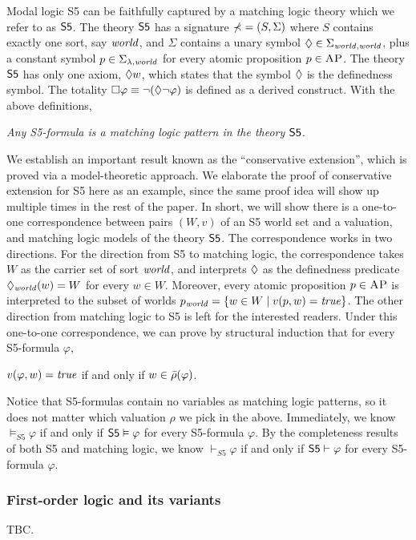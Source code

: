 \documentclass{amsart}
\begin{document}
Modal logic S5 can be faithfully captured by
a matching logic theory which we refer to as $\mathsf{S5}$.
The theory $\mathsf{S5}$ has a signature $\mathbb{\Sigma} = (S, \Sigma)$ where
$S$ contains exactly one sort, say $\mathit{world}$,
and $\Sigma$ contains a unary symbol
${\lozenge} \in \Sigma_{\mathit{world},\mathit{world}}$,
plus a constant symbol $p \in \Sigma_{\lambda,\mathit{world}}$
for every atomic proposition $p \in \textsc{AP}$.
The theory $\mathsf{S5}$ has only one axiom, ${\lozenge} w$, which states that
the symbol ${\lozenge}$ is the definedness symbol.
The totality ${\square} \varphi \equiv \neg ({\lozenge} \neg \varphi)$
is defined as a derived construct.
With the above definitions,
\begin{center}
\emph{
Any S5-formula is a matching logic pattern in the theory $\mathsf{S5}$.
}
\end{center}

We establish an important result known as the ``conservative extension'',
which is proved via a model-theoretic approach.
We elaborate the proof of conservative extension for S5 here as an example,
since the same proof idea will show up multiple times in the rest of the paper.
In short, we will show there is a one-to-one correspondence between
pairs $(W,v)$ of an S5 world set and a valuation, 
and matching logic models of the theory $\mathsf{S5}$.
The correspondence works in two directions.
For the direction from S5 to matching logic,
the correspondence takes $W$ as the carrier set of sort $\mathit{world}$,
and interprets ${\lozenge}$ as the definedness predicate
${\lozenge}_{\mathit{world}} (w) = W$ for every $w \in W$.
Moreover, every atomic proposition $p \in \textsc{AP}$ is interpreted to
the subset of worlds $p_{\mathit{world}} = \{ w \in W \mid v(p, w) = \mathit{true} \}$.
The other direction from matching logic to S5 is left for 
the interested readers.
Under this one-to-one correspondence, 
we can prove by structural induction that for every S5-formula $\varphi$,
\begin{center}
$v(\varphi, w) = \mathit{true}$
\quad if and only if \quad
$w \in \bar{\rho}(\varphi)$.
\end{center}
Notice that S5-formulas contain no variables as matching logic patterns,
so it does not matter which valuation $\rho$ we pick in the above.
Immediately, we know $\vDash_{S5} \varphi$ if and only if
$\mathsf{S5} \vDash \varphi$ for every S5-formula $\varphi$.
By the completeness results of both S5 and matching logic,
we know $\vdash_{S5} \varphi$ if and only if $\mathsf{S5} \vdash \varphi$
for every S5-formula $\varphi$.

\subsubsection{First-order logic and its variants}
TBC.
\end{document}
